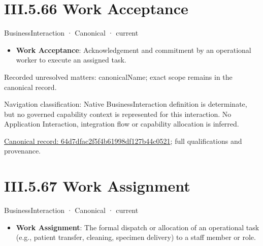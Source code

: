 \section*{III.5.66 Work Acceptance}
\label{navigation:III.5.66}

\label{element:64d7dfac2f5f4b61998df127b44c0521}
{\small BusinessInteraction · Canonical · current}\par

\begin{itemize}


\item \textbf{Work Acceptance}: Acknowledgement and commitment by an operational worker to execute an assigned task.

\end{itemize}

{\small Recorded unresolved matters: canonicalName; exact scope remains in the canonical record.}\par
{\small Navigation classification: Native BusinessInteraction definition is determinate, but no governed capability context is represented for this interaction. No Application Interaction, integration flow or capability allocation is inferred.}\par
{\footnotesize \href{../../../../continuum/business/business-interaction/64d7dfac2f5f4b61998df127b44c0521.md}{Canonical record: 64d7dfac2f5f4b61998df127b44c0521}; full qualifications and provenance.}\par
\section*{III.5.67 Work Assignment}
\label{navigation:III.5.67}

\label{element:c5611769a52d44aebeef55bd48e1f433}
{\small BusinessInteraction · Canonical · current}\par

\begin{itemize}


\item \textbf{Work Assignment}: The formal dispatch or allocation of an operational task (e.g., patient transfer, cleaning, specimen delivery) to a staff member or role.

\end{itemize}

